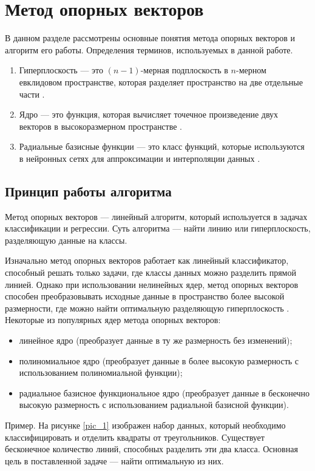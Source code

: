 \chapter{Метод опорных векторов}
В данном разделе рассмотрены основные понятия метода опорных векторов и алгоритм его работы. 
Определения терминов, используемых в данной работе.
\begin{enumerate}[label=\arabic*.]
	\item Гиперплоскость --- это $(n-1)$-мерная подплоскость в $n$-мерном евклидовом пространстве, которая разделяет пространство на две отдельные части \cite{hyperploskostb}.
	\item Ядро --- это функция, которая вычисляет точечное произведение двух векторов в высокоразмерном пространстве \cite{kernel}.
	\item Радиальные базисные функции --- это класс функций, которые используются в нейронных сетях для аппроксимации и интерполяции данных \cite{rbf}.
\end{enumerate}

\section*{Принцип работы алгоритма}

Метод опорных векторов --- линейный алгоритм, который используется в задачах классификации и регрессии. 
Суть алгоритма --- найти линию или гиперплоскость, разделяющую данные на классы.

Изначально метод опорных векторов работает как линейный классификатор, способный решать только задачи, где классы данных можно разделить прямой линией. 
Однако при использовании нелинейных ядер, метод опорных векторов способен преобразовывать исходные данные в пространство более высокой размерности, где можно найти оптимальную разделяющую гиперплоскость \cite{all}. 
Некоторые из популярных ядер метода опорных векторов:
\begin{itemize}
	\item линейное ядро (преобразует данные в ту же размерность без изменений);
	\item полиномиальное ядро (преобразует данные в более высокую размерность с использованием полиномиальной функции);
	\item радиальное базисное функциональное ядро (преобразует данные в бесконечно высокую размерность с использованием радиальной базисной функции).
\end{itemize}

Пример. На рисунке \ref{pic_1} изображен набор данных, который необходимо классифицировать и отделить квадраты от треугольников. Существует бесконечное количество линий, способных разделить эти два класса. Основная цель в поставленной задаче --- найти оптимальную из них.

